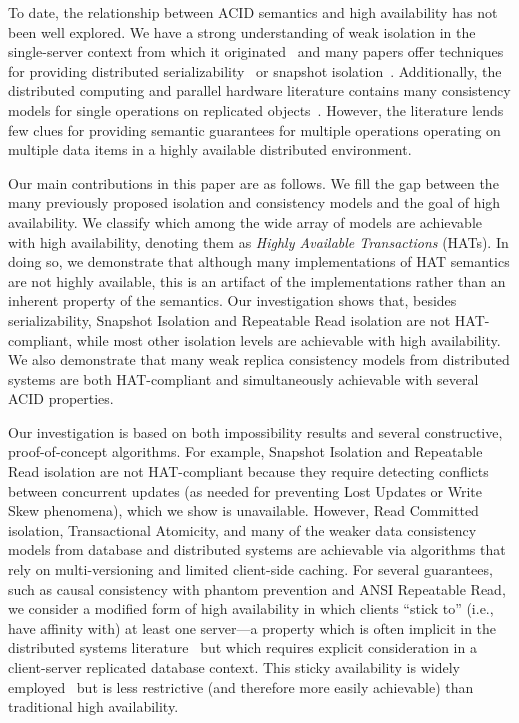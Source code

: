 To date, the relationship between ACID semantics and high
availability has not been well explored. We have a strong
understanding of weak isolation in the single-server context from
which it originated~\cite{adya, ansicritique, gray-isolation} and many
papers offer techniques for providing distributed
serializability~\cite{bernstein-book, spanner, daudjee-session,
  hstore, krikellas-bargain, calvin, kemme-classification} or snapshot
isolation~\cite{daudjee-snapshot,generalizedsnapshot, kemme-snapshot,
  walter}. Additionally, the distributed computing and parallel
hardware literature contains many consistency models for single
operations on replicated objects~\cite{pnuts, herlihy-art, eiger, cac,
  sessionguarantees}. However, the literature lends few clues for
providing semantic guarantees for multiple operations operating on
multiple data items in a highly available distributed environment.

Our main contributions in this paper are as follows. We fill the gap
between the many previously proposed isolation and consistency models
and the goal of high availability.  We classify which among the wide
array of models are achievable with high availability, denoting them
as {\em Highly Available Transactions} (HATs). In doing so, we
demonstrate that although many implementations of HAT semantics are
not highly available, this is an artifact of the implementations
rather than an inherent property of the semantics. Our investigation
shows that, besides serializability, Snapshot Isolation and Repeatable
Read isolation are not HAT-compliant, while most other isolation
levels are achievable with high availability. We also demonstrate that
many weak replica consistency models from distributed systems are both
HAT-compliant and simultaneously achievable with several ACID
properties.

Our investigation is based on both impossibility results and several
constructive, proof-of-concept algorithms. For example, Snapshot
Isolation and Repeatable Read isolation are not HAT-compliant because
they require detecting conflicts between concurrent updates (as needed
for preventing Lost Updates or Write Skew phenomena), which we show
is unavailable. However, Read Committed isolation, Transactional
Atomicity, and many of the weaker data consistency models from
database and distributed systems are achievable via algorithms that
rely on multi-versioning and limited client-side caching. For several
guarantees, such as causal consistency with phantom prevention and
ANSI Repeatable Read, we consider a modified form of high availability
in which clients ``stick to'' (i.e., have affinity with) at least one
server---a property which is often implicit in the distributed systems
literature~\cite{herlihy-art, eiger, cac} but which requires explicit
consideration in a client-server replicated database context. This
sticky availability is widely employed~\cite{eiger, vogels-defs} but
is less restrictive (and therefore more easily achievable) than
traditional high availability.

